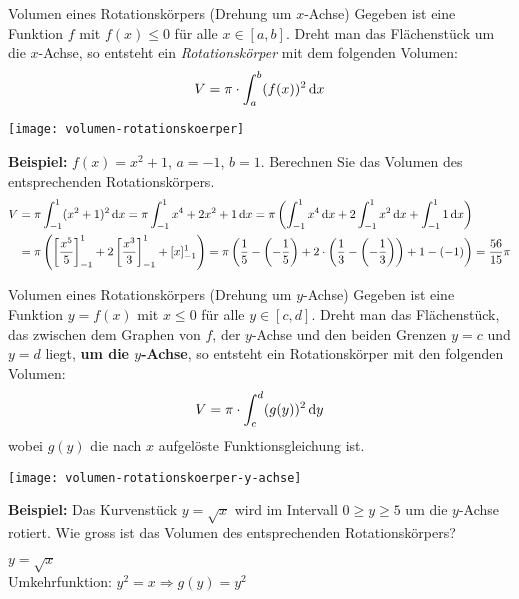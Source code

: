 \begin{definition}{Volumen eines Rotationskörpers (Drehung um $x$-Achse)}
    Gegeben ist eine Funktion $f$ mit $f(x) \leq 0$ für alle $x \in [a,b]$.
    Dreht man das Flächenstück um die $x$-Achse, so entsteht ein \emph{Rotationskörper} mit dem folgenden Volumen: \[V = \pi \cdot \int_{a}^{b} (f(x))^2 \,\mathrm{d}x\]
\end{definition}

\begin{center}
    \texttt{[image: volumen-rotationskoerper]}
\end{center}

\textbf{Beispiel:} $f(x) = x^2 + 1$, $a = -1$, $b = 1$.
Berechnen Sie das Volumen des entsprechenden Rotationskörpers.
\begin{align*}
    V &= \pi \int_{-1}^{1} (x^2 + 1)^2 \,\mathrm{d}x = \pi \int_{-1}^{1} x^4 + 2 x^2 + 1 \,\mathrm{d}x = \pi \left( \int_{-1}^{1} x^4 \,\mathrm{d}x + 2 \int_{-1}^{1} x^2 \,\mathrm{d}x + \int_{-1}^{1} 1 \,\mathrm{d}x \right) \\
    &= \pi \left( \left[ \frac{x^5}{5} \right]_{-1}^{1} + 2 \left[ \frac{x^3}{3} \right]_{-1}^{1} + [x]_{-1}^{1} \right) = \pi \left( \frac{1}{5} - \left( -\frac{1}{5} \right) + 2 \cdot \left( \frac{1}{3} - \left( -\frac{1}{3} \right) \right) + 1 - (-1) \right) = \frac{56}{15} \pi
\end{align*}

\begin{definition}{Volumen eines Rotationskörpers (Drehung um $y$-Achse)}
    Gegeben ist eine Funktion $y = f(x)$ mit $x \leq 0$ für alle $y \in [c, d]$.
    Dreht man das Flächenstück, das zwischen dem Graphen von $f$, der $y$-Achse und den beiden Grenzen $y = c$ und $y = d$ liegt, \textbf{um die $y$-Achse}, so entsteht ein Rotationskörper mit den folgenden Volumen: \[V = \pi \cdot \int_{c}^{d} (g(y))^2 \,\mathrm{d}y\] wobei $g(y)$ die nach $x$ aufgelöste Funktionsgleichung ist.
\end{definition}

\begin{center}
    \texttt{[image: volumen-rotationskoerper-y-achse]}
\end{center}

\textbf{Beispiel:} Das Kurvenstück $y = \sqrt {x}$ wird im Intervall $0 \geq y \geq 5$ um die $y$-Achse rotiert.
Wie gross ist das Volumen des entsprechenden Rotationskörpers?

$y = \sqrt {x}$ \\
Umkehrfunktion: $y^2 = x \Rightarrow g(y) = y^2$

